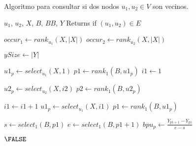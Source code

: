 \begin{algorithm}[H]
\caption{Algoritmo para consultar si dos nodos $u_{1}, u_{2} \in V$ son vecinos.}
\label{alg:twonodes}
\begin{algorithmic}[1]
    \REQUIRE $u_{1}$, $u_{2}$, $X$, $B$, $BB$, $Y$
    \ENSURE Returns if $(u_{1}, u_{2}) \in E$

    \STATE $occur_{1} \leftarrow rank_{u_{1}}(X, |X|)$
    \STATE $occur_{2} \leftarrow rank_{u_{2}}(X, |X|)$
    
    \STATE $ySize \leftarrow |Y|$
    
    \STATE $u1_{p} \leftarrow select_{u_{1}}(X, 1)$
    	\STATE $p1 \leftarrow rank_{1}(B, u1_{p})$
    	\STATE $i1 \leftarrow 1$

        	\STATE $u2_{p} \leftarrow select_{u_{2}}(X, i2)$
        	\STATE $p2 \leftarrow rank_{1}(B, u2_{p})$
        	
        		\STATE $i1 \leftarrow i1 + 1$
        			\RETURN \FALSE
        		\ENDIF
        		\STATE $u1_{p} \leftarrow select_{u_{1}}(X, i1)$
    			\STATE $p1 \leftarrow rank_{1}(B, u1_{p})$
    		\ENDWHILE
    		
    				\RETURN \TRUE
    			\ENDIF
    			
    			\STATE $s \leftarrow select_{1}(B, p1)$
    			\STATE $e \leftarrow select_{1}(B, p1 + 1)$
        		\STATE $bpu_{p} \leftarrow \frac{Y_{p1 + 1} - Y_{p1}}{e - s}$
        		
                		\RETURN \TRUE
                	\ENDIF
            	\ENDFOR        		
        		
    		\ENDIF
        
    \ENDFOR

    \RETURN $\FALSE$
\end{algorithmic}
\end{algorithm}
